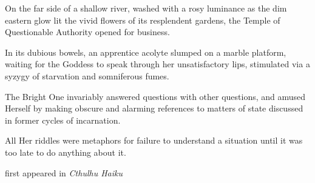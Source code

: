 On the far side of a shallow river, washed with a rosy luminance as the
dim eastern glow lit the vivid flowers of its resplendent gardens, the
Temple of Questionable Authority opened for business.

In its dubious bowels, an apprentice acolyte slumped on a marble
platform, waiting for the Goddess to speak through her unsatisfactory
lips, stimulated via a syzygy of starvation and somniferous fumes.

The Bright One invariably answered questions with other questions, and
amused Herself by making obscure and alarming references to matters of
state discussed in former cycles of incarnation.

All Her riddles were metaphors for failure to understand a situation
until it was too late to do anything about it.

first appeared in \emph{Cthulhu Haiku}
